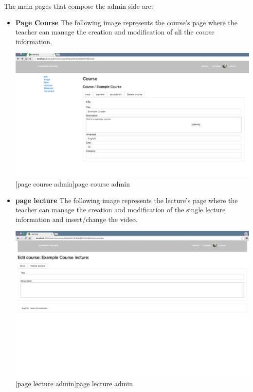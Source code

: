 The main pages that compose the admin side are:

\begin{itemize}
\item \textbf{Page Course} The following image represents the course's page where the teacher can manage the creation and modification of all the course information.\par

\begin{minipage}{\linewidth}
    \centering
    \includegraphics[width=1.0\linewidth]{images/chapter4/page-course-admin.png}
    [page course admin]{page course admin}
\end{minipage}

\item \textbf{page lecture} The following image represents the lecture's page where the teacher can manage the creation and modification of the single lecture information and insert/change the video.\par

\begin{minipage}{\linewidth}
    \centering
    \includegraphics[width=1.0\linewidth]{images/chapter4/page-lecture-admin.png}
    [page lecture admin]{page lecture admin}
\end{minipage}


\end{itemize}
